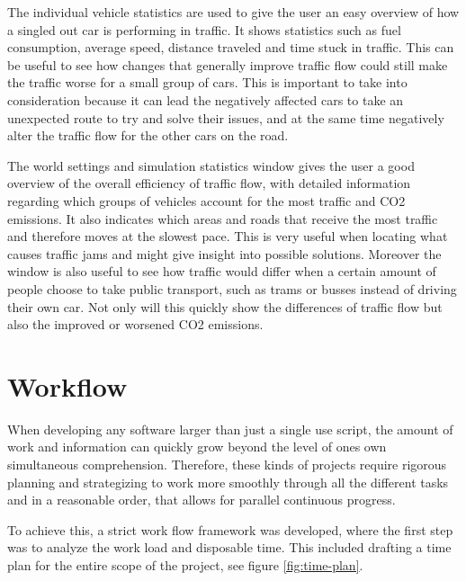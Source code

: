         The individual vehicle statistics are used to give the user an easy overview of how a singled out car is performing in traffic. It shows statistics such as fuel consumption, average speed, distance traveled and time stuck in traffic. This can be useful to see how changes that generally improve traffic flow could still make the traffic worse for a small group of cars. This is important to take into consideration because it can lead the negatively affected cars to take an unexpected route to try and solve their issues, and at the same time negatively alter the traffic flow for the other cars on the road.

        The world settings and simulation statistics window gives the user a good overview of the overall efficiency of traffic flow, with detailed information regarding which groups of vehicles account for the most traffic and CO2 emissions. It also indicates which areas and roads that receive the most traffic and therefore moves at the slowest pace. This is very useful when locating what causes traffic jams and might give insight into possible solutions. Moreover the window is also useful to see how traffic would differ when a certain amount of people choose to take public transport, such as trams or busses instead of driving their own car. Not only will this quickly show the differences of traffic flow but also the improved or worsened CO2 emissions.

\section{Workflow}
    When developing any software larger than just a single use script, the amount of work and information can quickly grow beyond the level of ones own simultaneous comprehension. Therefore, these kinds of projects require rigorous planning and strategizing to work more smoothly through all the different tasks and in a reasonable order, that allows for parallel continuous progress.

    To achieve this, a strict work flow framework was developed, where the first step was to analyze the work load and disposable time. This included drafting a time plan for the entire scope of the project, see figure \ref{fig:time-plan}. 

